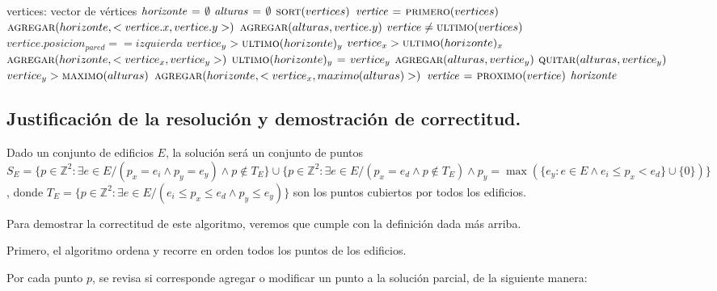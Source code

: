 \begin{codebox}
\li \Comment vertices: vector de vértices
\li $\id{horizonte} \gets \emptyset$
\li $\id{alturas} \gets \emptyset$
\li $\textnormal{\scshape sort}(vertices)$
\li $\id{vertice} \gets \proc{primero}(vertices)$
\li $\textnormal{\scshape agregar}(horizonte, <vertice.x, vertice.y>)$
\li $\textnormal{\scshape agregar}(alturas, vertice.y)$
\li \While $vertice \neq \textnormal{\scshape ultimo}(vertices)$
      \Do
\li     \If $vertice.posicion_{pared} == izquierda$
          \Then
\li         \If $vertice_y > \textnormal{\scshape ultimo}(horizonte)_y$
              \Then
\li             \If $vertice_x > \textnormal{\scshape ultimo}(horizonte)_x$
                  \Then
\li                 $\textnormal{\scshape agregar}(horizonte, <vertice_x, vertice_y>)$
\li               \Else
\li                 $\textnormal{\scshape ultimo}(horizonte)_y \mathrel{\hspace{1pt}=\hspace{1pt}} vertice_y$
                 \End
              \End
\li         $\textnormal{\scshape agregar}(alturas, vertice_y)$
\li       \Else
\li         $\textnormal{\scshape quitar}(alturas, vertice_y)$
\li         \If $vertice_y > \textnormal{\scshape maximo}(alturas)$
              \Then
\li             $\textnormal{\scshape agregar}(horizonte, <vertice_x, maximo(alturas)>)$
              \End
          \End
\li     $\id{vertice} \gets \proc{proximo}(vertice)$
      \End
\li \Return $\id{horizonte}$
\end{codebox}



\subsection{Justificación de la resolución y demostración de correctitud.}

\vspace*{0.3cm}


Dado un conjunto de edificios $E$, la solución será un conjunto de puntos
$S_E = \{p \in \mathbb{Z}^2 : \exists e \in E / (p_x = e_i \land p_y = e_y) \land
p \notin T_E\} \cup \{p \in \mathbb{Z}^2 : \exists e \in E / (p_x = e_d \land p
\notin T_E) \land p_y = \max({\{e_y : e \in E \land e_i \leq p_x < e_d\} \cup \{0\}})\}$,
donde $T_E = \{p \in \mathbb{Z}^2 : \exists e \in E / (e_i \leq p_x \leq e_d \land p_y \leq e_y)\}$
son los puntos cubiertos por todos los edificios.

Para demostrar la correctitud de este algoritmo, veremos que cumple con la
definición dada más arriba.

Primero, el algoritmo ordena y recorre en orden todos los puntos de los edificios.

Por cada punto $p$, se revisa si corresponde agregar o modificar un punto a la
solución parcial, de la siguiente manera:

